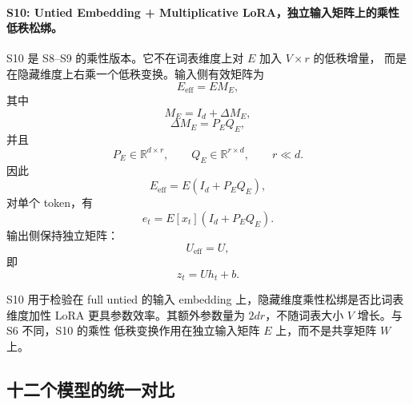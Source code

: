 \paragraph{S10: Untied Embedding + Multiplicative LoRA，独立输入矩阵上的乘性低秩松绑。}
S10 是 S8--S9 的乘性版本。它不在词表维度上对 $E$ 加入 $V \times r$ 的低秩增量，
而是在隐藏维度上右乘一个低秩变换。输入侧有效矩阵为
\begin{equation}
    E_{\mathrm{eff}} = E M_E,
\end{equation}
其中
\begin{equation}
    M_E = I_d + \Delta M_E,
\end{equation}
\begin{equation}
    \Delta M_E = P_E Q_E,
\end{equation}
并且
\begin{equation}
    P_E \in \mathbb{R}^{d \times r}, \qquad
    Q_E \in \mathbb{R}^{r \times d}, \qquad
    r \ll d.
\end{equation}
因此
\begin{equation}
    E_{\mathrm{eff}} = E(I_d+P_EQ_E),
\end{equation}
对单个 token，有
\begin{equation}
    e_t = E[x_t](I_d+P_EQ_E).
\end{equation}
输出侧保持独立矩阵：
\begin{equation}
    U_{\mathrm{eff}} = U,
\end{equation}
即
\begin{equation}
    z_t = U h_t + b.
\end{equation}

S10 用于检验在 full untied 的输入 embedding 上，隐藏维度乘性松绑是否比词表维度加性 LoRA
更具参数效率。其额外参数量为 $2dr$，不随词表大小 $V$ 增长。与 S6 不同，S10 的乘性
低秩变换作用在独立输入矩阵 $E$ 上，而不是共享矩阵 $W$ 上。

\subsection{十二个模型的统一对比}

